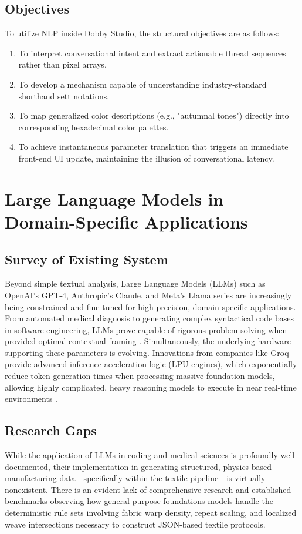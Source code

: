 \subsection{Objectives}
To utilize NLP inside Dobby Studio, the structural objectives are as follows:
\begin{enumerate}
    \item To interpret conversational intent and extract actionable thread sequences rather than pixel arrays.
    \item To develop a mechanism capable of understanding industry-standard shorthand sett notations.
    \item To map generalized color descriptions (e.g., "autumnal tones") directly into corresponding hexadecimal color palettes.
    \item To achieve instantaneous parameter translation that triggers an immediate front-end UI update, maintaining the illusion of conversational latency.
\end{enumerate}

\section{Large Language Models in Domain-Specific Applications}

\subsection{Survey of Existing System}
Beyond simple textual analysis, Large Language Models (LLMs) such as OpenAI's GPT-4, Anthropic's Claude, and Meta's Llama series are increasingly being constrained and fine-tuned for high-precision, domain-specific applications. From automated medical diagnosis to generating complex syntactical code bases in software engineering, LLMs prove capable of rigorous problem-solving when provided optimal contextual framing \cite{ref5}. Simultaneously, the underlying hardware supporting these parameters is evolving. Innovations from companies like Groq provide advanced inference acceleration logic (LPU engines), which exponentially reduce token generation times when processing massive foundation models, allowing highly complicated, heavy reasoning models to execute in near real-time environments \cite{ref6}.

\subsection{Research Gaps}
While the application of LLMs in coding and medical sciences is profoundly well-documented, their implementation in generating structured, physics-based manufacturing data—specifically within the textile pipeline—is virtually nonexistent. There is an evident lack of comprehensive research and established benchmarks observing how general-purpose foundations models handle the deterministic rule sets involving fabric warp density, repeat scaling, and localized weave intersections necessary to construct JSON-based textile protocols.

